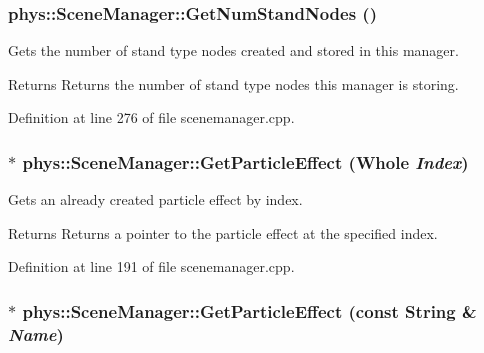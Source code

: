 \hypertarget{classphys_1_1SceneManager_ae0cf3beb3e8419c3385b53a3bd7dab8f}{
\subsubsection[{GetNumStandNodes}]{ phys::SceneManager::GetNumStandNodes ()}}
\label{dd/da8/classphys_1_1SceneManager_ae0cf3beb3e8419c3385b53a3bd7dab8f}


Gets the number of stand type nodes created and stored in this manager. 

\begin{DoxyReturn}{Returns}
Returns the number of stand type nodes this manager is storing. 
\end{DoxyReturn}


Definition at line 276 of file scenemanager.cpp.

\hypertarget{classphys_1_1SceneManager_ae8508d38b670e4d2d16ee1f5a95dc29b}{
\subsubsection[{GetParticleEffect}]{ $\ast$ phys::SceneManager::GetParticleEffect ({\bf Whole} {\em Index})}}
\label{dd/da8/classphys_1_1SceneManager_ae8508d38b670e4d2d16ee1f5a95dc29b}


Gets an already created particle effect by index. 

\begin{DoxyReturn}{Returns}
Returns a pointer to the particle effect at the specified index. 
\end{DoxyReturn}


Definition at line 191 of file scenemanager.cpp.

\hypertarget{classphys_1_1SceneManager_ab1afc8a739b5f9756b9d7f5a26f2913b}{
\subsubsection[{GetParticleEffect}]{ $\ast$ phys::SceneManager::GetParticleEffect (const {\bf String} \& {\em Name})}}
\label{dd/da8/classphys_1_1SceneManager_ab1afc8a739b5f9756b9d7f5a26f2913b}


